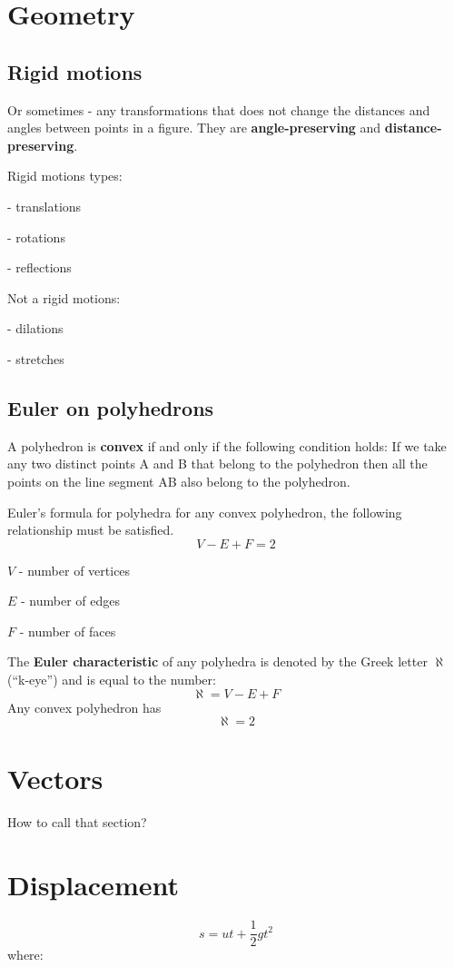 \documentclass{article}
\begin{document}
\section{Geometry}
\subsection{Rigid motions}
Or sometimes - any transformations that does not change the distances
and angles between points in a figure. They are \textbf{angle-preserving} and
\textbf{distance-preserving}.


Rigid motions types:

- translations

- rotations

- reflections


Not a rigid motions:

- dilations

- stretches

\subsection{Euler on polyhedrons}
A polyhedron is \textbf{convex} if and only if the following condition
holds:
If we take any two distinct points A and B that belong to the polyhedron
then all the points on the line segment AB also belong to the polyhedron.

Euler's formula for polyhedra for any convex polyhedron, the following
relationship must be satisfied.
\begin{equation}
  V - E + F = 2
\end{equation}

$V$ - number of vertices

$E$ - number of edges

$F$ - number of faces

The \textbf{Euler characteristic} of any polyhedra is denoted by the
Greek letter $\aleph$ (``k-eye'') and is equal to the number:
\begin{equation}
  \aleph = V - E + F
\end{equation}
Any convex polyhedron has
\begin{equation}
  \aleph = 2
\end{equation}
\section{Vectors}
How to call that section?
\section{Displacement}
\begin{equation}
  s = ut+\frac{1}{2}gt^2
\end{equation}
where:
\end{document}
